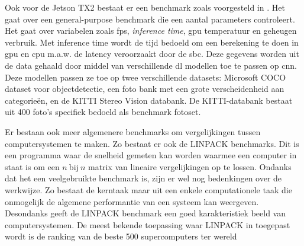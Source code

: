 	Ook voor de Jetson TX2 bestaat er een benchmark zoals voorgesteld in \cite{bordignonbenchmarking}. Het gaat over een general-purpose benchmark die een aantal parameters controleert. Het gaat over variabelen zoals \gls{fps}, \textit{inference time}, \gls{gpu} temperatuur en geheugen verbruik. Met inference time wordt de tijd bedoeld om een berekening te doen in \gls{gpu} en \gls{cpu} m.a.w. de latency veroorzaakt door de \gls{sbc}. Deze gegevens worden uit de data gehaald door middel van verschillende \gls{dl} modellen toe te passen op \gls{cnn}. Deze modellen passen ze toe op twee verschillende datasets: Microsoft COCO dataset voor objectdetectie, een foto bank met een grote verscheidenheid aan categorie\"en, en de KITTI Stereo Vision databank. De KITTI-databank bestaat uit 400 foto's specifiek bedoeld als benchmark fotoset.
	
	Er bestaan ook meer algemenere benchmarks om vergelijkingen tussen computersystemen te maken. Zo bestaat er ook de LINPACK benchmarks\cite{bron:LINPACKBENCHMARK}. Dit is een programma waar de snelheid gemeten kan worden waarmee een computer in staat is om een $n~ $bij$~ n$ matrix van lineaire vergelijkingen op te lossen. Ondanks dat het een veelgebruikte benchmark is, zijn er wel nog bedenkingen over de werkwijze. Zo bestaat de kerntaak maar uit een enkele computationele taak die onmogelijk de algemene performantie van een systeem kan weergeven. Desondanks geeft de LINPACK benchmark een goed karakteristiek beeld van computersystemen. De meest bekende toepassing waar LINPACK in toegepast wordt is de ranking van de beste 500 supercomputers ter wereld\cite{bron:LINPACKBENCHMARK500}





	

